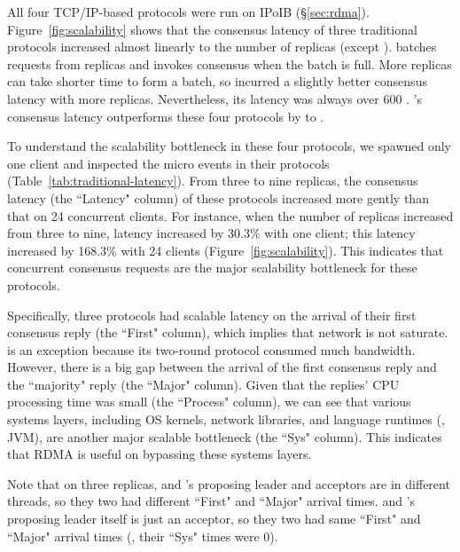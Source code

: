 All four TCP/IP-based protocols were run on IPoIB (\S\ref{sec:rdma}). 
Figure~\ref{fig:scalability} shows that the consensus latency of three 
traditional protocols increased almost linearly to the number of replicas 
(except \spaxos). \spaxos batches requests from replicas and invokes consensus 
when the batch is full. More replicas can take shorter time to form a batch, so 
\spaxos incurred a slightly better consensus latency with more replicas. 
Nevertheless, its latency was always over 600 \us. \xxx's consensus latency 
outperforms these four protocols by \comptradlow to \comptradhigh.



To understand the scalability bottleneck in these four protocols, we spawned 
only one client and inspected the micro events in their protocols 
(Table~\ref{tab:traditional-latency}). From three to nine replicas, the 
consensus latency (the ``Latency" column) of these protocols increased more 
gently than that on 24 concurrent clients. For instance, when the number of 
replicas increased from three to nine, \zookeeper latency increased by 30.3\% 
with one client; this latency increased by 168.3\% with 24 clients 
(Figure~\ref{fig:scalability}). This indicates that concurrent consensus 
requests are the major scalability bottleneck for these protocols.

Specifically, three protocols had scalable latency on the arrival of their 
first consensus reply (the ``First" column), which implies that network is not 
saturate. \libpaxos is an exception because its two-round protocol consumed 
much bandwidth. However, there is a big gap between the arrival of the first 
consensus reply and the ``majority" reply (the ``Major" column). Given that the 
replies' CPU processing time was small (the ``Process" column), we can see that 
various systems layers, including OS kernels, network libraries, and 
language runtimes (\eg, JVM), are another major scalable bottleneck (the ``Sys" 
column). This indicates that RDMA is useful on bypassing these systems layers.

Note that on three replicas, \libpaxos and \crane's proposing 
leader and acceptors are in different threads, so they two had different 
``First" and ``Major" arrival times. \crane and \spaxos's proposing 
leader itself is just an acceptor, so they two had same ``First" and ``Major" 
arrival times (\ie, their ``Sys" times were 0).

